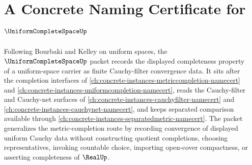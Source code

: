 \chapter{A Concrete Naming Certificate for $\UniformCompleteSpaceUp$}
\label{ch:concrete-instances-uniform-complete-space-namecert}

Following Bourbaki and Kelley on uniform spaces, the $\UniformCompleteSpaceUp$
packet records the displayed completeness property of a uniform-space carrier
as finite Cauchy-filter convergence data. It sits after the completion
interfaces of \autoref{ch:concrete-instances-metriccompletion-namecert} and
\autoref{ch:concrete-instances-uniformcompletion-namecert}, reads the
Cauchy-filter and Cauchy-net surfaces of
\autoref{ch:concrete-instances-cauchyfilter-namecert} and
\autoref{ch:concrete-instances-cauchynet-namecert}, and keeps separated
comparison available through
\autoref{ch:concrete-instances-separatedmetric-namecert}. The packet
generalizes the metric-completion route by recording convergence of displayed
uniform Cauchy data without constructing quotient completions, choosing
representatives, invoking countable choice, importing open-cover compactness,
or asserting completeness of $\RealUp$.


